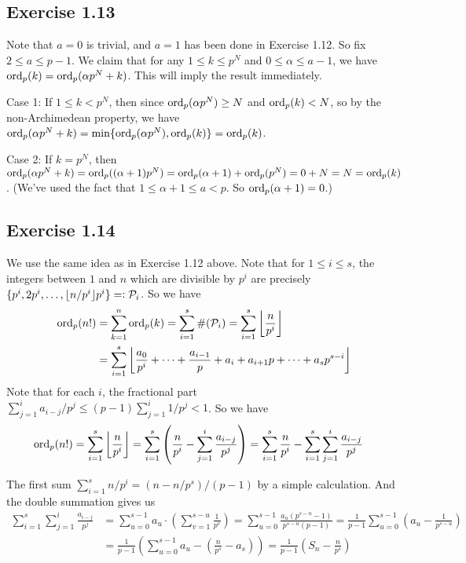 \documentclass[../Koblitz.tex]{subfiles}
\begin{document}
\subsection*{Exercise 1.13}

Note that $a=0$ is trivial, and $a=1$ has been done in Exercise 1.12. So fix $2\leq a\leq p-1$. We claim that for any $1\leq k\leq p^N$ and $0\leq\alpha\leq a-1$, we have $\operatorname{ord}_p(k)=\operatorname{ord}_p(\alpha p^N+k)$. This will imply the result immediately.

Case 1: If $1\leq k<p^N$, then since $\operatorname{ord}_p(\alpha p^N)\geq N$ and $\operatorname{ord}_p(k)<N$, so by the non-Archimedean property, we have $\operatorname{ord}_p(\alpha p^N+k) = \min\{\operatorname{ord}_p(\alpha p^N),\operatorname{ord}_p(k)\} = \operatorname{ord}_p(k)$.

Case 2: If $k=p^N$, then $\operatorname{ord}_p(\alpha p^N+k) = \operatorname{ord}_p((\alpha+1)p^N) = \operatorname{ord}_p(\alpha+1) + \operatorname{ord}_p(p^N) = 0+N = N = \operatorname{ord}_p(k)$. (We've used the fact that $1\leq \alpha+1 \leq a < p$. So $\operatorname{ord}_p(\alpha+1)=0$.)

\subsection*{Exercise 1.14}

We use the same idea as in Exercise 1.12 above. Note that for $1\leq i\leq s$, the integers between $1$ and $n$ which are divisible by $p^i$ are precisely $\{p^i,2p^i,\ldots,\lfloor n/p^i\rfloor p^i\}=:\mathcal{P}_i$. So we have
\begin{align*}
    \operatorname{ord}_p(n!) &= \sum_{k=1}^n \operatorname{ord}_p(k) = \sum_{i=1}^s \#(\mathcal{P}_i) = \sum_{i=1}^s \left \lfloor \frac{n}{p^i} \right \rfloor \\
    &= \sum_{i=1}^s \left \lfloor \frac{a_0}{p^i} + \cdots + \frac{a_{i-1}}{p} + a_i + a_{i+1}p + \cdots +a_sp^{s-i} \right \rfloor
\end{align*}
Note that for each $i$, the fractional part $\sum_{j=1}^i a_{i-j}/p^j \leq (p-1)\sum_{j=1}^i 1/p^j < 1$. So we have
\begin{align*}
    \operatorname{ord}_p(n!) &= \sum_{i=1}^s \left \lfloor \frac{n}{p^i} \right \rfloor = \sum_{i=1}^s \left(\frac{n}{p^i}- \sum_{j=1}^i \frac{a_{i-j}}{p^j} \right) = \sum_{i=1}^s \frac{n}{p^i} - \sum_{i=1}^s \sum_{j=1}^i \frac{a_{i-j}}{p^j}
\end{align*}

The first sum $\sum_{i=1}^s n/p^i = (n-n/p^s)/(p-1)$ by a simple calculation. And the double summation gives us
\begin{align*}
    \sum_{i=1}^s \sum_{j=1}^i \frac{a_{i-j}}{p^j} &= \sum_{u=0}^{s-1} a_u\cdot\left( \sum_{v=1}^{s-u} \frac{1}{p^v} \right)= \sum_{u=0}^{s-1} \frac{a_u(p^{s-u}-1)}{p^{s-u}(p-1)} = \frac{1}{p-1} \sum_{u=0}^{s-1}\left(a_u-\frac{1}{p^{s-u}}\right) \\
    &= \frac{1}{p-1} \left(\sum_{u=0}^{s-1} a_u - \left(\frac{n}{p^s}-a_s\right)\right) = \frac{1}{p-1} \left(S_n - \frac{n}{p^s}\right) 
\end{align*}
\end{document}

